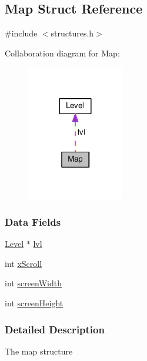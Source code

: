 \hypertarget{struct_map}{\subsection{Map Struct Reference}
\label{struct_map}
}


{\ttfamily \#include $<$structures.\-h$>$}



Collaboration diagram for Map\-:\nopagebreak
\begin{figure}[H]
\begin{center}
\leavevmode
\includegraphics[width=120pt]{struct_map__coll__graph}
\end{center}
\end{figure}
\subsubsection*{Data Fields}
\begin{DoxyCompactItemize}
\item 
\hyperlink{struct_level}{Level} $\ast$ \hyperlink{struct_map_abca19b7de8e60347a507d1aeff95c764}{lvl}
\item 
int \hyperlink{struct_map_aa83bbdf2603e42824cd0bab44bf315c2}{x\-Scroll}
\item 
int \hyperlink{struct_map_ae50cb92a78d9e0a4f4bd718fc02bd294}{screen\-Width}
\item 
int \hyperlink{struct_map_a9ebc1dbd77788c4bfa27758a6725413f}{screen\-Height}
\end{DoxyCompactItemize}


\subsubsection{Detailed Description}
The map structure 


